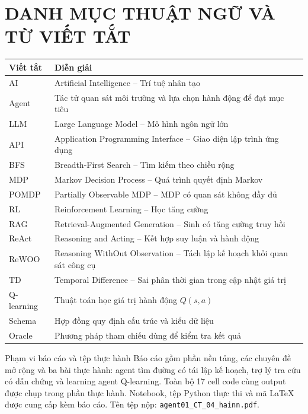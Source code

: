 \setcounter{tocdepth}{2}
\begingroup
\linespread{1.0}\selectfont
\tableofcontents
\endgroup
\clearpage
{}
{}
\listoffigures
\clearpage
\section*{DANH MỤC THUẬT NGỮ VÀ TỪ VIẾT TẮT}
{}
\begin{tabularx}{\linewidth}{@{}p{2.2cm}X@{}}
\toprule
\textbf{Viết tắt} & \textbf{Diễn giải}\\\midrule
AI & Artificial Intelligence -- Trí tuệ nhân tạo\\
Agent & Tác tử quan sát môi trường và lựa chọn hành động để đạt mục tiêu\\
LLM & Large Language Model -- Mô hình ngôn ngữ lớn\\
API & Application Programming Interface -- Giao diện lập trình ứng dụng\\
BFS & Breadth-First Search -- Tìm kiếm theo chiều rộng\\
MDP & Markov Decision Process -- Quá trình quyết định Markov\\
POMDP & Partially Observable MDP -- MDP có quan sát không đầy đủ\\
RL & Reinforcement Learning -- Học tăng cường\\
RAG & Retrieval-Augmented Generation -- Sinh có tăng cường truy hồi\\
ReAct & Reasoning and Acting -- Kết hợp suy luận và hành động\\
ReWOO & Reasoning WithOut Observation -- Tách lập kế hoạch khỏi quan sát công cụ\\
TD & Temporal Difference -- Sai phân thời gian trong cập nhật giá trị\\
Q-learning & Thuật toán học giá trị hành động $Q(s,a)$\\
Schema & Hợp đồng quy định cấu trúc và kiểu dữ liệu\\
Oracle & Phương pháp tham chiếu dùng để kiểm tra kết quả\\
\bottomrule
\end{tabularx}
\vspace{0.7cm}
\begin{academicbox}{Phạm vi báo cáo và tệp thực hành}
Báo cáo gồm phần nền tảng, các chuyên đề mở rộng và ba bài thực hành: agent tìm
đường có tái lập kế hoạch, trợ lý tra cứu có dẫn chứng và learning agent Q-learning.
Toàn bộ 17 cell code cùng output được chụp trong phần thực hành. Notebook, tệp
Python thực thi và mã LaTeX được cung cấp kèm báo cáo. Tên tệp nộp:
\texttt{agent01\_CT\_04\_hainn.pdf}.
\end{academicbox}
\clearpage
{}
\setcounter{page}{1}
